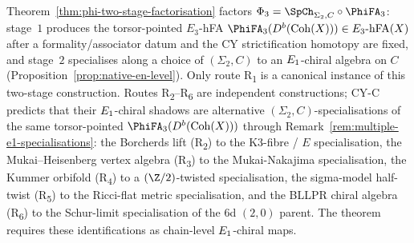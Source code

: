 \begin{remark}
\label{rem:six-routes-two-stage}
Theorem~\ref{thm:phi-two-stage-factorisation} factors $\Phi_3 = \SpCh_{\Sigma_2, C} \circ \PhiFA_3$: stage~$1$ produces the torsor-pointed $E_3$-hFA $\PhiFA_3(D^b(\Coh(X))) \in \EdHolFA(X)$ after a formality/associator datum and the CY strictification homotopy are fixed, and stage~$2$ specialises along a choice of $(\Sigma_2, C)$ to an $E_{1}$-chiral algebra on $C$ (Proposition~\ref{prop:native-en-level}). Only route R\textsubscript{1} is a canonical instance of this two-stage construction. Routes R\textsubscript{2}--R\textsubscript{6} are independent constructions; CY-C predicts that their $E_{1}$-chiral shadows are alternative $(\Sigma_2, C)$-specialisations of the same torsor-pointed $\PhiFA_3(D^b(\Coh(X)))$ through Remark~\ref{rem:multiple-e1-specialisations}: the Borcherds lift (R\textsubscript{2}) to the K3-fibre / $E$ specialisation, the Mukai--Heisenberg vertex algebra (R\textsubscript{3}) to the Mukai-Nakajima specialisation, the Kummer orbifold (R\textsubscript{4}) to a $(\Z/2)$-twisted specialisation, the sigma-model half-twist (R\textsubscript{5}) to the Ricci-flat metric specialisation, and the BLLPR chiral algebra (R\textsubscript{6}) to the Schur-limit specialisation of the $6$d $(2,0)$ parent. The theorem requires these identifications as chain-level $E_{1}$-chiral maps.
\end{remark}


